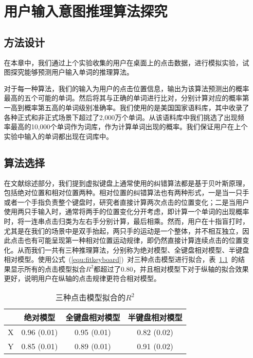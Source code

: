 \chapter{用户输入意图推理算法探究}
\label{cha:algorithm}
\section{方法设计}
在本章中，我们通过上个实验收集的用户在桌面上的点击数据，进行模拟实验，试图探究能够预测用户输入单词的推理算法。

对于每一种算法，我们的输入为用户的点击位置信息，输出为该算法预测出的概率最高的五个可能的单词。然后将其与正确的单词进行比对，分别计算对应的概率第一高到概率第五高的单词级别准确率。我们使用的是美国国家语料库，其中收录了各种正式和非正式场景下超过了2,000万个单词。从该语料库中我们挑选了出现频率最高的10,000个单词作为词库，作为计算单词出现的概率。我们保证用户在上个实验中输入的单词都出现在词库中。

\section{算法选择}
在文献综述部分，我们提到虚拟键盘上通常使用的纠错算法都是基于贝叶斯原理，包括绝对位置和相对位置两种。相对位置的纠错算法也有两种形式，一是当一只手或者一个手指负责整个键盘时，研究者直接计算两次点击的位置变化；二是当用户使用两只手输入时，通常将两手的位置变化分开考虑，即计算一个单词的出现概率时，将一连串点击归类为左右手分别计算，最后相乘。然而，用户在十指盲打时，尤其是在我们的场景中是双手抬起，两只手的运动是一个整体，并不相互独立，因此点击也有可能呈现第一种相对位置运动规律，即仍然直接计算连续点击的位置变化。从而我们一共有三种推理算法，分别称为绝对模型、全键盘相对模型、半键盘相对模型。使用公式~(\ref{equ:fitkeyboard})~对三种点击模型进行拟合，表~\ref{tab:modelr2}~的结果显示所有的点击模型拟合$R^2$都超过了0.80，并且相对模型下对于纵轴的拟合效果更好，说明用户在纵轴的点击规律更符合相对模型。

\begin{table}[htb]
  \centering
  \begin{minipage}[t]{0.6\linewidth} %
  \caption[三种点击模型拟合的$R^{2}$]{三种点击模型拟合的$R^{2}$}
  \label{tab:modelr2}
    \centering
    \begin{tabularx}{\linewidth}{cccc}
      \toprule[1.5pt]
      & 绝对模型 & 全键盘相对模型 & 半键盘相对模型 \\\midrule[1pt]
      X & 0.96 (0.01) & 0.95 (0.01) & 0.82 (0.02) \\
      Y & 0.85 (0.01) & 0.89 (0.01) & 0.91 (0.02)\\
      \bottomrule[1.5pt]
    \end{tabularx}
  \end{minipage}
\end{table}

